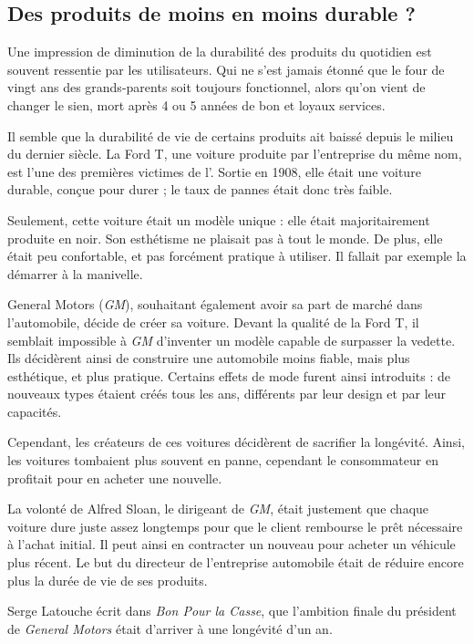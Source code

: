 \subsection{Des produits de moins en moins durable ?}

Une impression de diminution de la durabilité des produits du quotidien est souvent ressentie par les utilisateurs. Qui ne s'est jamais étonné que le four de vingt ans des grands-parents soit toujours fonctionnel, alors qu'on vient de changer le sien, mort après 4 ou 5 années de bon et loyaux services. 

Il semble que la durabilité de vie de certains produits ait baissé depuis le milieu du dernier siècle. 
\smallbreak
La Ford T, une voiture produite par l'entreprise du même nom, est l'une des premières victimes de l'\op. Sortie en 1908, elle était une voiture durable, conçue pour durer ; le taux de pannes était donc très faible.   

Seulement, cette voiture était un modèle unique : elle était majoritairement produite en noir. Son esthétisme ne plaisait pas à tout le monde. De plus, elle était peu confortable, et pas forcément pratique à utiliser. Il fallait par exemple la démarrer à la manivelle. 

General Motors (\textit{GM}), souhaitant également avoir sa part de marché dans l'automobile, décide de créer sa voiture. Devant la qualité de la Ford T, il semblait impossible à \textit{GM} d'inventer un modèle capable de surpasser la vedette. Ils décidèrent ainsi de construire une automobile moins fiable, mais plus esthétique, et plus pratique. Certains effets de mode furent ainsi introduits : de nouveaux types étaient créés tous les ans, différents par leur design et par leur capacités.


Cependant, les créateurs de ces voitures décidèrent de sacrifier la longévité. Ainsi, les voitures tombaient plus souvent en panne, cependant le consommateur en profitait pour en acheter une nouvelle.


La volonté de Alfred Sloan, le dirigeant de \textit{GM}, était justement que chaque voiture dure juste assez longtemps pour que le client rembourse le prêt nécessaire à l'achat initial.
Il peut ainsi en contracter un nouveau pour acheter un véhicule plus récent. Le but du directeur de l'entreprise automobile était de réduire encore plus la durée de vie de ses produits.

Serge Latouche écrit dans \textit{Bon Pour la Casse}\cite{bpc}, que l'ambition finale du président de \textit{General Motors} était d'arriver à une longévité d'un an.

